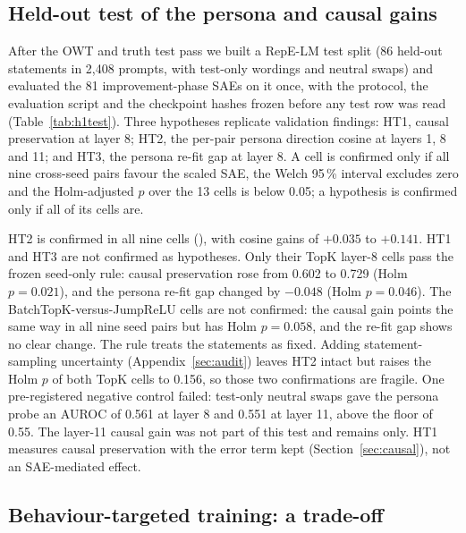 \subsection{Held-out test of the persona and causal gains}\label{sec:h1test}

After the OWT and truth test pass we built a RepE-LM test split (86 held-out statements in 2{,}408 prompts, with
test-only wordings and neutral swaps) and evaluated the 81 improvement-phase SAEs on it once, with the protocol, the
evaluation script and the checkpoint hashes frozen before any test row was read (Table~\ref{tab:h1test}). Three
hypotheses replicate validation findings: HT1, causal preservation at layer 8; HT2, the per-pair persona direction
cosine at layers 1, 8 and 11; and HT3, the persona re-fit gap at layer 8. A cell is confirmed only if all nine
cross-seed pairs favour the scaled SAE, the Welch 95\,\% interval excludes zero and the Holm-adjusted $p$ over the 13
cells is below 0.05; a hypothesis is confirmed only if all of its cells are.

HT2 is confirmed in all nine cells (), with cosine gains of $+0.035$ to $+0.141$. HT1 and HT3
are not confirmed as hypotheses. Only their TopK layer-8 cells pass the frozen seed-only rule: causal preservation rose
from 0.602 to 0.729 (Holm $p=0.021$), and the persona re-fit gap changed by $-0.048$ (Holm $p=0.046$). The
BatchTopK-versus-JumpReLU cells are not confirmed: the causal gain points the same way in all nine seed pairs but has
Holm $p=0.058$, and the re-fit gap shows no clear change. The rule treats the statements as fixed. Adding
statement-sampling uncertainty (Appendix~\ref{sec:audit}) leaves HT2 intact but raises the Holm $p$ of both TopK cells
to 0.156, so those two confirmations are fragile. One pre-registered negative control failed: test-only neutral swaps
gave the persona probe an AUROC of 0.561 at layer 8 and 0.551 at layer 11, above the floor of 0.55. The layer-11 causal
gain was not part of this test and remains  only. HT1 measures causal preservation with the error
term kept (Section~\ref{sec:causal}), not an SAE-mediated effect.



\subsection{Behaviour-targeted training: a trade-off}\label{sec:r4}

